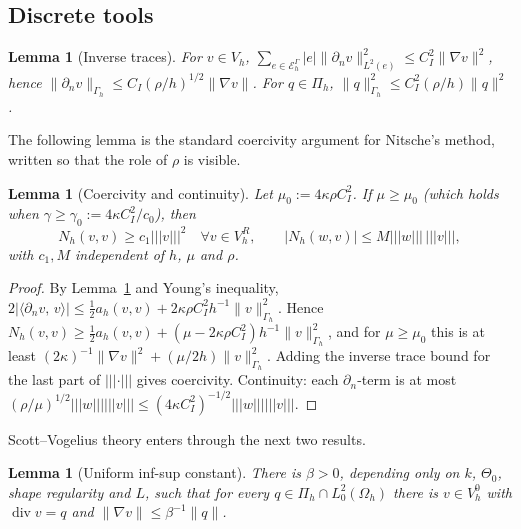 \documentclass[pdflatex,sn-mathphys-num]{sn-jnl}
\theoremstyle{thmstyleone}
\newtheorem{lemma}[theorem]{Lemma}
\theoremstyle{thmstylethree}
\newcommand{\Gh}{\Gamma_h}
\newcommand{\Oh}{\Omega_h}
\newcommand{\EG}{\mathcal E_h^\Gamma}
\newcommand{\Vh}{V_h}
\newcommand{\VR}{V_h^R}
\newcommand{\VO}{V_h^0}
\newcommand{\Pih}{\Pi_h}
\newcommand{\dn}{\partial_n}
\newcommand{\ip}[2]{\langle #1,\, #2\rangle}
\newcommand{\tnorm}[1]{|\!|\!|#1|\!|\!|}
\newcommand{\norm}[1]{\lVert #1\rVert}
\renewcommand{\div}{\operatorname{div}}
\begin{document}
\subsection{Discrete tools}
\begin{lemma}[Inverse traces]\label{lem:inverse}
For $v\in\Vh$, $\sum_{e\in\EG}|e|\norm{\dn v}^2_{L^2(e)}\le C_I^2\norm{\nabla v}^2$, hence $\norm{\dn v}_{\Gh}\le C_I(\rho/h)^{1/2}\norm{\nabla v}$. For $q\in\Pih$, $\norm{q}^2_{\Gh}\le C_I^2(\rho/h)\norm{q}^2$.
\end{lemma}

The following lemma is the standard coercivity argument for Nitsche's method, written so that the role of $\rho$ is visible.

\begin{lemma}[Coercivity and continuity]\label{lem:coercive}
Let $\mu_0:=4\kappa\rho C_I^2$. If $\mu\ge\mu_0$ (which holds when $\gamma\ge\gamma_0:=4\kappa C_I^2/c_0$), then
\[
N_h(v,v)\ge c_1\tnorm{v}^2\quad\forall v\in\VR,\qquad |N_h(w,v)|\le M\tnorm{w}\,\tnorm{v},
\]
with $c_1,M$ independent of $h$, $\mu$ and $\rho$.
\end{lemma}

\begin{proof}
By Lemma~\ref{lem:inverse} and Young's inequality, $2|\ip{\dn v}{v}|\le\frac12a_h(v,v)+2\kappa\rho C_I^2h^{-1}\norm{v}^2_{\Gh}$. Hence $N_h(v,v)\ge\frac12a_h(v,v)+(\mu-2\kappa\rho C_I^2)h^{-1}\norm{v}^2_{\Gh}$, and for $\mu\ge\mu_0$ this is at least $(2\kappa)^{-1}\norm{\nabla v}^2+(\mu/2h)\norm{v}^2_{\Gh}$. Adding the inverse trace bound for the last part of $\tnorm\cdot$ gives coercivity. Continuity: each $\dn$-term is at most $(\rho/\mu)^{1/2}\tnorm w\tnorm v\le(4\kappa C_I^2)^{-1/2}\tnorm w\tnorm v$.
\end{proof}

Scott--Vogelius theory enters through the next two results.

\begin{lemma}[Uniform inf-sup constant]\label{lem:infsup}
There is $\beta>0$, depending only on $k$, $\Theta_0$, shape regularity and $L$, such that for every $q\in\Pih\cap L^2_0(\Oh)$ there is $v\in\VO$ with $\div v=q$ and $\norm{\nabla v}\le\beta^{-1}\norm{q}$.
\end{lemma}
\end{document}

